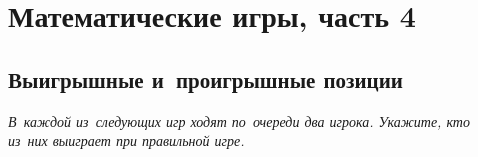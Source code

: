 

\section*{Математические игры, часть 4}



\subsection*{Выигрышные и~проигрышные позиции}


\emph{%
В~каждой из~следующих игр ходят по~очереди два игрока.
Укажите, кто из~них выиграет при правильной игре.}

